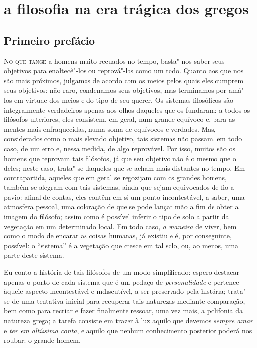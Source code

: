 \part{a filosofia na era trágica dos gregos}

\chapter{Primeiro prefácio}

\textsc{No que tange} a homens muito recuados no tempo, basta"-nos saber
seus objetivos para enaltecê"-los ou reprová"-los como um todo. Quanto
aos que nos são mais próximos, julgamos de acordo com os meios pelos
quais eles cumprem seus objetivos: não raro, condenamos seus objetivos,
mas terminamos por amá"-los em virtude dos meios e do tipo de seu
querer. Os sistemas filosóficos são integralmente verdadeiros apenas
aos olhos daqueles que os fundaram: a todos os filósofos ulteriores,
eles consistem, em geral, num grande equívoco e, para as mentes mais
enfraquecidas, numa soma de equívocos e verdades. Mas, considerados
como o mais elevado objetivo, tais sistemas não passam, em todo caso,
de um erro e, nessa medida, de algo reprovável. Por isso, muitos são
os homens que reprovam tais filósofos, já que seu objetivo não é o
mesmo que o deles; neste caso, trata"-se daqueles que se acham mais
distantes no tempo. Em contrapartida, aqueles que em geral se regozijam
com os grandes homens, também se alegram com tais sistemas, ainda que
sejam equivocados de fio a pavio: afinal de contas, eles contêm em si
um ponto incontestável, a saber, uma atmosfera pessoal, uma coloração \label{atmosferapessoal}
de que se pode lançar mão a fim de obter a imagem do filósofo; assim como
é possível inferir o tipo de solo a partir da vegetação em um determinado local. \label{possivelinferir}
Em todo caso, \textit{a maneira} de viver, bem como o modo de encarar as coisas \label{amaneirade}
humanas, já existiu e é, por conseguinte, possível: o ``sistema'' é a
vegetação que cresce em tal solo, ou, ao menos, uma parte deste sistema. 

Eu conto a história de tais filósofos de um modo simplificado: espero destacar \label{simplificado}
apenas o ponto de cada sistema que é um pedaço de
\textit{personalidade} e pertence àquele aspecto incontestável e
indiscutível, a ser preservado pela história; trata"-se de
uma tentativa inicial para recuperar tais naturezas mediante \label{comparacao}
comparação, bem como para recriar e fazer finalmente ressoar, uma vez
mais, a polifonia da natureza grega; a tarefa consiste em trazer à luz
aquilo que devemos \textit{sempre amar} e \textit{ter em altíssima conta}, 
e aquilo que nenhum conhecimento posterior poderá nos roubar: o \label{ograndehomem}
grande homem.


